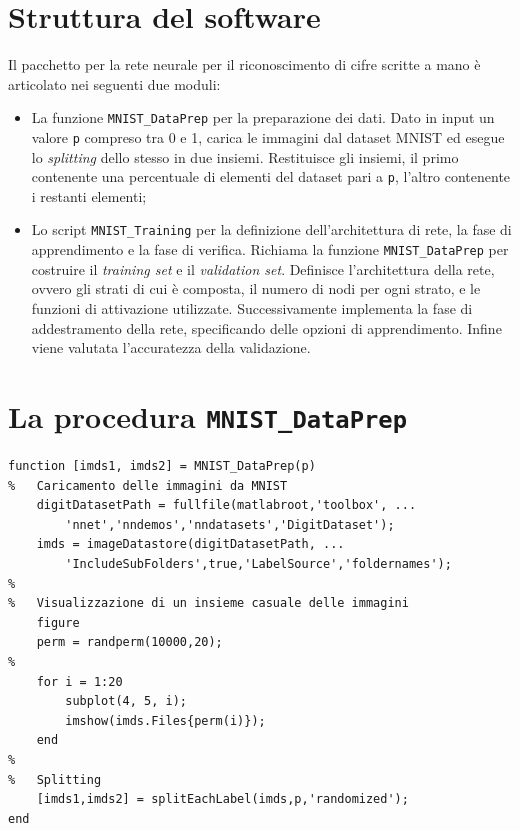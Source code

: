 \documentclass[a4paper,12pt]{article}
\begin{document}
\section{Struttura del software} %
Il pacchetto per la rete neurale per il riconoscimento di cifre scritte a mano è articolato nei seguenti due moduli:
\begin{itemize}
    \item La funzione \texttt{MNIST\_DataPrep} per la preparazione dei dati. Dato in input un valore \texttt{p} compreso tra 0 e 1, carica le immagini dal dataset MNIST ed esegue lo \emph{splitting} dello stesso in due insiemi. Restituisce gli insiemi, il primo contenente una percentuale di elementi del dataset pari a \texttt{p}, l'altro contenente i restanti elementi;
    \item Lo script \texttt{MNIST\_Training} per la definizione dell'architettura di rete, la fase di apprendimento e la fase di verifica. Richiama la funzione \texttt{MNIST\_DataPrep} per costruire il \emph{training set} e il \emph{validation set}. Definisce l'architettura della rete, ovvero gli strati di cui è composta, il numero di nodi per ogni strato, e le funzioni di attivazione utilizzate. Successivamente implementa la fase di addestramento della rete, specificando delle opzioni di apprendimento. Infine viene valutata l'accuratezza della validazione.
\end{itemize}





\newpage
\section{La procedura \texttt{MNIST\_DataPrep}} %

\begin{lstlisting}[style=Matlab-editor,title=\texttt{MNIST\_DataPrep.m},label=lst:dataprep]
function [imds1, imds2] = MNIST_DataPrep(p)
%   Caricamento delle immagini da MNIST
    digitDatasetPath = fullfile(matlabroot,'toolbox', ...
        'nnet','nndemos','nndatasets','DigitDataset');
    imds = imageDatastore(digitDatasetPath, ... 
        'IncludeSubFolders',true,'LabelSource','foldernames');
%
%   Visualizzazione di un insieme casuale delle immagini
    figure
    perm = randperm(10000,20);
%
    for i = 1:20
        subplot(4, 5, i);
        imshow(imds.Files{perm(i)});
    end
%
%   Splitting
    [imds1,imds2] = splitEachLabel(imds,p,'randomized');
end
\end{lstlisting}
\end{document}
